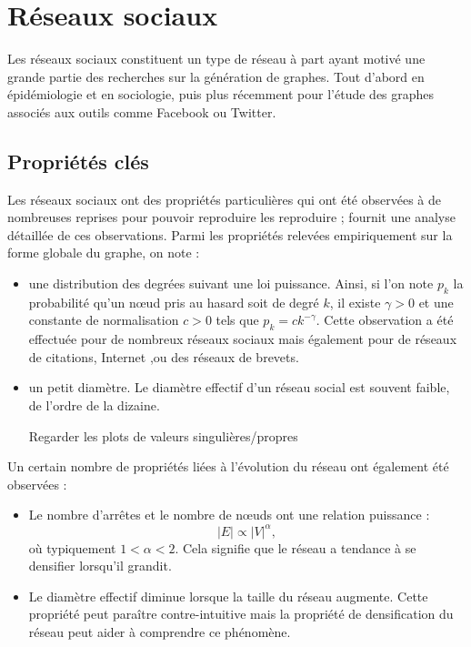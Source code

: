 \documentclass[a4paper]{article}
\begin{document}
\section{Réseaux sociaux}
\label{sec:reseaux_sociaux}
    Les réseaux sociaux constituent un type de réseau à part ayant motivé une
    grande partie des recherches sur la génération de graphes. Tout d'abord en
    épidémiologie et en sociologie, puis plus récemment pour l'étude des
    graphes associés aux outils comme Facebook ou Twitter.

    \subsection{Propriétés clés}
    \label{sub:proprietes_cles}
        Les réseaux sociaux ont des propriétés particulières qui ont été
        observées à de nombreuses reprises pour pouvoir reproduire les
        reproduire ; \cite{Leskovec:2007:GED:1217299.1217301} fournit une
        analyse détaillée de ces observations. Parmi les propriétés relevées
        empiriquement sur la forme globale du graphe, on note :
        \begin{itemize}
            \item une distribution des degrées suivant une loi puissance.
                Ainsi, si l'on note $p_k$ la probabilité qu'un n\oe{}ud pris au
                hasard soit de degré $k$, il existe $\gamma > 0$ et une
                constante de normalisation $c > 0$ tels que
                $p_k = ck^{-\gamma}$. Cette observation a été effectuée pour de
                nombreux réseaux sociaux mais également pour de réseaux de
                citations, Internet \cite{chen2002origin},ou des réseaux de
                brevets.
            \item un petit diamètre. Le diamètre effectif d'un réseau social
                est souvent faible, de l'ordre de la dizaine.
\begin{todo}
Regarder les plots de valeurs singulières/propres
\end{todo}
        \end{itemize}
        Un certain nombre de propriétés liées à l'évolution du réseau ont
        également été observées :
        \begin{itemize}
            \item Le nombre d'arrêtes et le nombre de n\oe{}uds ont une
                relation puissance :
                \[
                    |E| \propto |V|^{\alpha},
                \]
                où typiquement $1 < \alpha < 2$. Cela signifie que le réseau a
                tendance à se densifier lorsqu'il grandit.
            \item Le diamètre effectif diminue lorsque la taille du réseau
                augmente. Cette propriété peut paraître contre-intuitive
                mais la propriété de densification du réseau peut aider à
                comprendre ce phénomène.
        \end{itemize}
\end{document}
